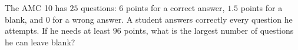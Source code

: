 The AMC 10 has $25$ questions: $6$ points for a correct answer, $1.5$ points for a blank, and $0$ for a wrong answer. A student answers correctly every question he attempts. If he needs at least $96$ points, what is the largest number of questions he can leave blank?

